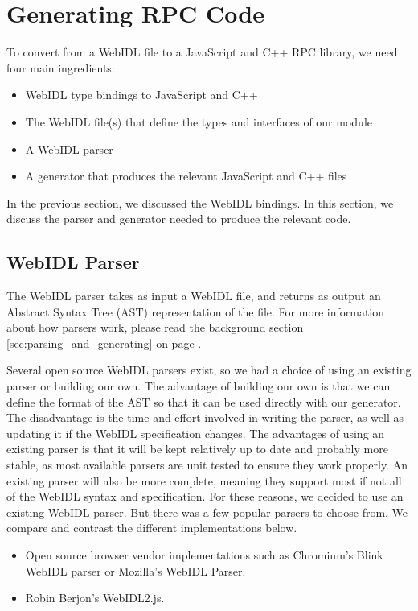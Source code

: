 \section{Generating RPC Code} %
\label{sec:generating_rpc_code}
To convert from a WebIDL file to a JavaScript and C++ RPC library, we need four main ingredients:

\begin{itemize}
	\item WebIDL type bindings to JavaScript and C++
	\item The WebIDL file(s) that define the types and interfaces of our module
	\item A WebIDL parser
	\item A generator that produces the relevant JavaScript and C++ files
\end{itemize}

In the previous section, we discussed the WebIDL bindings. In this section, we discuss the parser and generator needed to produce the relevant code.

\subsection{WebIDL Parser} %
\label{sub:webidl_parser_design}
The WebIDL parser takes as input a WebIDL file, and returns as output an Abstract Syntax Tree (AST) representation of the file. For more information about how parsers work, please read the background section \ref{sec:parsing_and_generating} on page \pageref{sec:parsing_and_generating}. 

Several open source WebIDL parsers exist, so we had a choice of using an existing parser or building our own. The advantage of building our own is that we can define the format of the AST so that it can be used directly with our generator. The disadvantage is the time and effort involved in writing the parser, as well as updating it if the WebIDL specification changes. The advantages of using an existing parser is that it will be kept relatively up to date and probably more stable, as most available parsers are unit tested to ensure they work properly. An existing parser will also be more complete, meaning they support most if not all of the WebIDL syntax and specification. For these reasons, we decided to use an existing WebIDL parser. But there was a few popular parsers to choose from. We compare and contrast the different implementations below.

\begin{itemize}
	\item Open source browser vendor implementations such as Chromium's Blink WebIDL parser\cite{chromiumwebidlparser} or Mozilla's WebIDL Parser\cite{mozillawebidlparser}.
	\item Robin Berjon's WebIDL2.js\cite{berjonwebidljs}.
\end{itemize}

